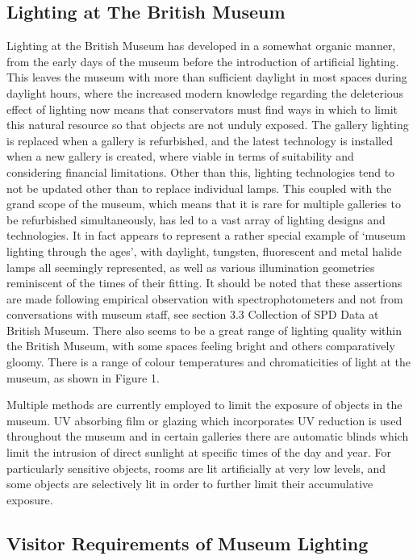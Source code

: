 \subsection{Lighting at The British Museum}

Lighting at the British Museum has developed in a somewhat organic manner, from the early days of the museum before the introduction of artificial lighting. This leaves the museum with more than sufficient daylight in most spaces during daylight hours, where the increased modern knowledge regarding the deleterious effect of lighting now means that conservators must find ways in which to limit this natural resource so that objects are not unduly exposed. 
The gallery lighting is replaced when a gallery is refurbished, and the latest technology is installed when a new gallery is created, where viable in terms of suitability and considering financial limitations. Other than this, lighting technologies tend to not be updated other than to replace individual lamps. This coupled with the grand scope of the museum, which means that it is rare for multiple galleries to be refurbished simultaneously, has led to a vast array of lighting designs and technologies. It in fact appears to represent a rather special example of `museum lighting through the ages', with daylight, tungsten, fluorescent and metal halide lamps all seemingly represented, as well as various illumination geometries reminiscent of the times of their fitting. It should be noted that these assertions are made following empirical observation with spectrophotometers and not from conversations with museum staff, see section 3.3 Collection of SPD Data at British Museum.
There also seems to be a great range of lighting quality within the British Museum, with some spaces feeling bright and others comparatively gloomy. There is a range of colour temperatures and chromaticities of light at the museum, as shown in Figure 1.

Multiple methods are currently employed to limit the exposure of objects in the museum. UV absorbing film or glazing which incorporates UV reduction is used throughout the museum and in certain galleries there are automatic blinds which limit the intrusion of direct sunlight at specific times of the day and year. For particularly sensitive objects, rooms are lit artificially at very low levels, and some objects are selectively lit in order to further limit their accumulative exposure.

\subsection{Visitor Requirements of Museum Lighting}


